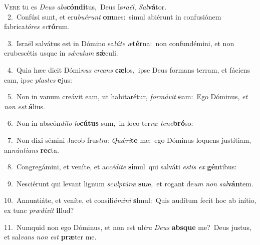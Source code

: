 \lettrine{\initial\textcolor{\initialcolor}{V}}{ere} tu es \textit{De}\-\textit{us} \textit{abs}\-\textbf{cón}\textbf{di}tus,~\star Deus Is\-\textit{ra}\-\textit{ël}, \textit{Sal}\-\textbf{vá}tor.\\
{\numbfont\textcolor{\numbcolor}{~2.}}~Confúsi sunt, et eru\-\textit{bu}\-\textit{é}\textit{runt} \textbf{om}\-nes:~\star simul abiérunt in confusiónem fabrica\-\textit{tó}\-\textit{res} \textit{er}\-\textbf{ró}rum.\par
{\numbfont\textcolor{\numbcolor}{~3.}}~Israël salvátus est in Dómino sa\-\textit{lú}\-\textit{te} \textit{æ}\-\textbf{tér}na:~\star non confundémini, et non erubescétis usque in \textit{sǽ}\-\textit{cu}\textit{lum} \textbf{sǽ}\-culi.\par
{\numbfont\textcolor{\numbcolor}{~4.}}~Quia hæc dicit Dómi\textit{nus} \textit{cre}\-\textit{ans} \textbf{cæ}\-los,~\star ipse Deus formans terram, et fáciens eam, ip\textit{se} \textit{plas}\-\textit{tes} \textbf{e}\-jus:\par
{\numbfont\textcolor{\numbcolor}{~5.}}~Non in vanum creávit eam, ut habitarétur, \textit{for}\-\textit{má}\textit{vit} \textbf{e}\-am:~\star Ego Dóminus, \textit{et} \textit{non} \textit{est} \textbf{á}\-lius.\par
{\numbfont\textcolor{\numbcolor}{~6.}}~Non in abscón\-\textit{di}\-\textit{to} \textit{lo}\-\textbf{cú}\textbf{tus} sum,~\star in loco ter\textit{ræ} \textit{te}\-\textit{ne}\textbf{bró}so:\par
{\numbfont\textcolor{\numbcolor}{~7.}}~Non dixi sémini Jacob frus\-\textit{tra}\-: \textit{Quǽ}\-\textit{ri}\textbf{te} me:~\star ego Dóminus loquens justítiam, an\-\textit{nún}\-\textit{ti}\textit{ans} \textbf{rec}\-ta.\par
{\numbfont\textcolor{\numbcolor}{~8.}}~Congregámini, et veníte, et ac\-\textit{cé}\-\textit{di}\textit{te} \textbf{si}\-mul~\star qui salváti \textit{es}\-\textit{tis} \textit{ex} \textbf{gén}\-tibus:\par
{\numbfont\textcolor{\numbcolor}{~9.}}~Nesciérunt qui levant lignum \textit{sculp}\-\textit{tú}\textit{ræ} \textbf{su}\-æ,~\star et rogant de\textit{um} \textit{non} \textit{sal}\-\textbf{ván}tem.\par
{\numbfont\textcolor{\numbcolor}{10.}}~Annuntiáte, et veníte, et consili\-\textit{á}\-\textit{mi}\textit{ni} \textbf{si}\-mul:~\star Quis audítum fecit hoc ab inítio, ex tunc \textit{præ}\-\textit{dí}\textit{xit} \textbf{il}\-lud?\par
{\numbfont\textcolor{\numbcolor}{11.}}~Numquid non ego Dóminus, et non est ul\textit{tra} \textit{De}\-\textit{us} \textbf{abs}\-\textbf{que} me?~\star Deus justus, et sal\textit{vans} \textit{non} \textit{est} \textbf{præ}\-ter me.\par
